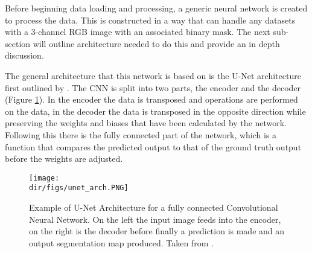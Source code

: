 Before beginning data loading and processing, a generic neural network is created to process the data. This is constructed in a way that can handle any datasets with a 3-channel RGB image with an associated binary mask. The next sub-section will outline architecture needed to do this and provide an in depth discussion. 
\par
The general architecture that this network is based on is the U-Net architecture first outlined by \citet{ronneberger15}. The CNN is split into two parts, the encoder and the decoder (Figure \ref{fig.u-net_arch}). In the encoder the data is transposed and operations are performed on the data, in the decoder the data is transposed in the opposite direction while preserving the weights and biases that have been calculated by the network. Following this there is the fully connected part of the network, which is a function that compares the predicted output to that of the ground truth output before the weights are adjusted.

\begin{figure}[htbp]
    \centering
    \texttt{[image: \\dir/figs/unet\_arch.PNG]}
    \caption[Example of U-Net Architecture for a fully connected Convolutional Neural Network]{Example of U-Net Architecture for a fully connected Convolutional Neural Network. On the left the input image feeds into the encoder, on the right is the decoder before finally a prediction is made and an output segmentation map produced. Taken from \citet{ronneberger15}.}
    \label{fig.u-net_arch}
\end{figure}

